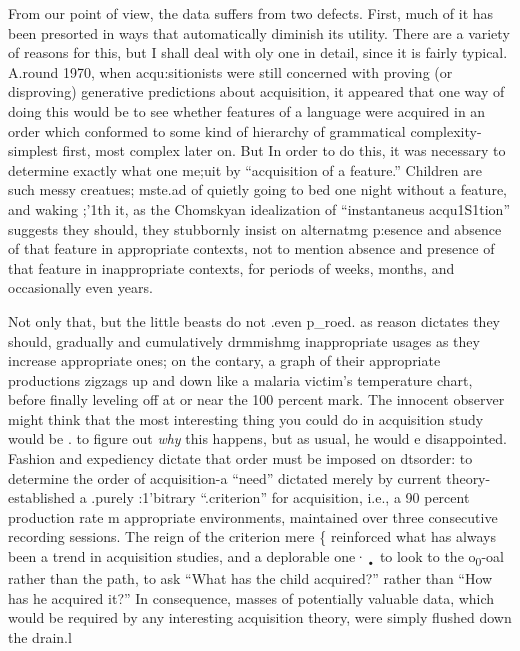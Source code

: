 From our point of view, the data suffers from two defects. First,
much of it has been presorted in ways that automatically diminish its utility. There are a variety of reasons for this, but I shall deal with oly one in detail, since it is fairly typical. A.round 1970, when acqu:si\-tionists were still concerned with proving (or disproving) generative predictions about acquisition, it appeared that one way of doing this would be to see whether features of a language were acquired in an order which conformed to some kind of hierarchy of grammatical complexity-simplest first, most complex later on. But In order to do this, it was necessary to determine exactly what one me;uit by ``acquisition of a feature.'' Children are such messy creatues; mste.ad of quietly going to bed one night without a feature, and waking ;'1th it, as the Chomskyan idealization of ``instantaneus acqu1S1tion'' suggests they should, they stubbornly insist on alternatmg p:esence and absence of that feature in appropriate contexts, not to mention absence and presence of that feature in inappropriate contexts, for periods of weeks, months, and occasionally even years.

Not only that, but the little beasts do not .even p\_roed. as
reason dictates they should, gradually and cumulatively drmmishmg inappropriate usages as they increase appropriate ones; on the contary, a graph of their appropriate productions zigzags up and down like a malaria victim's temperature chart, before finally leveling off at or near the 100 percent mark. The innocent observer might think that the
most interesting thing you could do in acquisition study would be . to figure out \textit{why} this happens, but as usual, he would e disappointed. Fashion and expediency dictate that order must be imposed on dts\-order: to determine the order of acquisition-a ``need'' dictated merely by current theory-\citet{Brown1973} established a .purely :1'bitrary ``.cri\-terion'' for acquisition, i.e., a 90 percent production rate m appropriate environments, maintained over three consecutive recording sessions. The reign of the criterion mere \{ reinforced what has always been
a trend in acquisition studies, and a deplorable one·\textsubscript{•}\textsubscript{ }to look to the o\textsubscript{0}-oal rather than the path, to ask ``What has the child acquired?'' rather than
``How has he acquired it?'' In consequence, masses of potentially valuable data, which would be required by any interesting acquisition theory, were simply flushed down the drain.l

